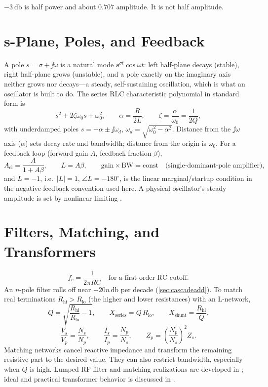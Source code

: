 \begin{mistakebox}
\(-\SI{3}{\decibel}\) is half power and about \(0.707\) amplitude. It is not
half amplitude.
\end{mistakebox}

\section{s-Plane, Poles, and Feedback}
A pole \(s=\sigma+\jj\omega\) is a natural mode \(\ee^{\sigma t}\cos\omega t\):
left half-plane decays (stable), right half-plane grows (unstable), and a pole
exactly on the imaginary axis neither grows nor decays---a steady, self-sustaining
oscillation, which is what an oscillator is built to do.
The series RLC characteristic polynomial in standard form is
\[
s^2+2\zeta\omega_0 s+\omega_0^2,
\qquad
\alpha=\frac{R}{2L},
\qquad
\zeta=\frac{\alpha}{\omega_0}=\frac{1}{2Q},
\]
with underdamped poles \(s=-\alpha\pm\jj\omega_d\), \(\omega_d=\sqrt{\omega_0^2-\alpha^2}\).
Distance from the \(\jj\omega\) axis (\(\alpha\)) sets decay rate and bandwidth;
distance from the origin is \(\omega_0\). For a feedback loop (forward gain \(A\),
feedback fraction \(\beta\)),
\[
A_{\mathrm{cl}}=\frac{A}{1+A\beta},
\qquad
L=A\beta,
\qquad
\text{gain}\times\text{BW}=\text{const}
\quad\text{(single-dominant-pole amplifier)},
\]
and \(L=-1\), i.e.\ \(|L|=1\), \(\angle L=-180^\circ\), is the linear
marginal/startup condition in the negative-feedback convention used here. A physical
oscillator's steady amplitude is set by nonlinear limiting
\cite[pp.~301--305]{free2022rfmicrowave}.

\section{Filters, Matching, and Transformers}
\[
f_c=\frac{1}{2\pi RC}\quad \text{for a first-order RC cutoff.}
\]
An \(n\)-pole filter rolls off near \(-20n\,\si{\decibel}\) per decade
(\cref{sec:cascadeadd}). To match
real terminations \(R_{\text{hi}}>R_{\text{lo}}\) (the higher and lower resistances)
with an L-network,
\[
Q=\sqrt{\frac{R_{\text{hi}}}{R_{\text{lo}}}-1},
\qquad
X_{\text{series}}=Q\,R_{\text{lo}},
\qquad
X_{\text{shunt}}=\frac{R_{\text{hi}}}{Q}.
\]
\[
\frac{V_s}{V_p}=\frac{N_s}{N_p},
\qquad
\frac{I_s}{I_p}=\frac{N_p}{N_s},
\qquad
Z_p=\left(\frac{N_p}{N_s}\right)^2 Z_s.
\]
Matching networks cancel reactive impedance and transform the remaining
resistive part to the desired value. They can also restrict bandwidth, especially
when \(Q\) is high. Lumped RF filter and matching realizations are developed in
\cite[pp.~37--79]{bowick2008rfcircuit}; ideal and practical transformer behavior is
discussed in \cite[pp.~131--143]{davis2011rfcircuit}.

